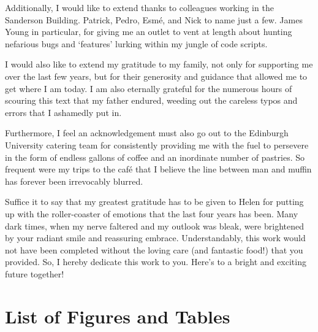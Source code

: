\documentclass[11pt,english,a4paper,twoside,openright]{report}
\begin{document}
{{	Additionally, I would like to extend thanks to colleagues working in the Sanderson Building. Patrick, Pedro, Esm\'e, and Nick to name just a few. James Young in particular, for giving me an outlet to vent at length about hunting nefarious bugs and `features' lurking within my jungle of code scripts.
	
	I would also like to extend my gratitude to my family, not only for supporting me over the last few years, but for their generosity and guidance that allowed me to get where I am today. I am also eternally grateful for the numerous hours of scouring this text that my father endured, weeding out the careless typos and errors that I ashamedly put in.
	
	Furthermore, I feel an acknowledgement must also go out to the Edinburgh University catering team for consistently providing me with the fuel to persevere in the form of endless gallons of coffee and an inordinate number of pastries. So frequent were my trips to the caf\'e that I believe the line between man and muffin has forever been irrevocably blurred.
	
	Suffice it to say that my greatest gratitude has to be given to Helen for putting up with the roller-coaster of emotions that the last four years has been. Many dark times, when my nerve faltered and my outlook was bleak, were brightened by your radiant smile and reassuring embrace. Understandably, this work would not have been completed without the loving care (and fantastic food!) that you provided. So, I hereby dedicate this work to you. Here's to a bright and exciting future together!
	
	\newpage
	\thispagestyle{empty}
	
	\tableofcontents

%	
\newpage
\thispagestyle{empty}

\chapter*{{\Huge L}ist of {\Huge F}igures and {\Huge T}ables}
	\begingroup
	
	\makeatletter
	\makeatother
	\let\clearpage\relax
	
}}
\end{document}
